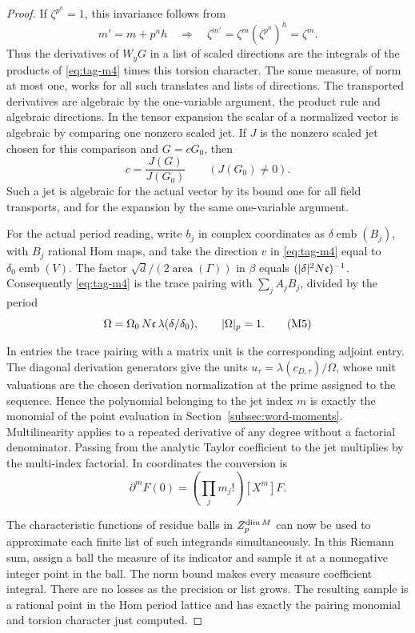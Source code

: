 \begin{proof}
If \(\zeta^{p^n}=1\), this invariance follows from
\[
  m'=m+p^n h\quad\Longrightarrow\quad\zeta^{m'}=\zeta^m(\zeta^{p^n})^h=\zeta^m .
\]
Thus the derivatives of \(W_yG\) in a list of scaled
directions are the integrals of the products of
\eqref{eq:tag-m4} times this torsion character. The same measure,
of norm at most one, works for all such translates
and lists of directions. The transported derivatives
are algebraic by the one-variable argument, the
product rule and algebraic directions. In the tensor
expansion the scalar of a normalized vector is
algebraic by comparing one nonzero scaled jet.
If \(J\) is the nonzero scaled jet chosen for this comparison and \(G=cG_0\), then
\[
  c=\frac{J(G)}{J(G_0)}\qquad(J(G_0)\ne0).
\]
Such a jet is algebraic for the actual vector by
its bound one for all field transports, and for the
expansion by the same one-variable argument.
\label{cor:word-measure-6}

For the actual period reading, write \(b_j\) in complex
coordinates as \(\delta\operatorname{emb}(B_j)\), with
\(B_j\) rational Hom maps, and take the direction \(v\)
in \eqref{eq:tag-m4} equal to \(\delta_0\operatorname{emb}(V)\).
The factor \(\sqrt d/(2\operatorname{area}(\Gamma))\)
in \(\beta\) equals \((\lvert\delta\rvert^2 N\mathfrak c)^{-1}\).
Consequently \eqref{eq:tag-m4} is the trace pairing with
\(\sum_j A_j B_j\), divided by the period
\[
       \Omega=\Omega_0\, N\mathfrak c\,\lambda(\delta/\delta_0),
                      \qquad \lvert\Omega\rvert_p=1.
\tag{M5}\label{eq:tag-m5}
\]

In entries the trace pairing with a matrix unit is the
corresponding adjoint entry. The diagonal derivation
generators give the units
\(u_\tau=\lambda(c_{D,\tau})/\Omega\), whose unit
valuations are the chosen derivation normalization at the
prime assigned to the sequence. Hence the polynomial belonging to the jet
index \(m\) is exactly the monomial of the point
evaluation in Section~\ref{subsec:word-moments}.
Multilinearity applies to a repeated derivative of any
degree without a factorial denominator. Passing from the
analytic Taylor coefficient to the jet multiplies by the
multi-index factorial.
In coordinates the conversion is
\[
  \partial^m F(0)=\left(\prod_j m_j!\right)[X^m]F .
\]

The characteristic functions of residue balls
in \(Z_p^{\dim M}\) can now be used to approximate each
finite list of such integrands simultaneously. In this
Riemann sum, assign a ball the measure of its indicator
and sample it at a nonnegative integer point in the ball.
The norm bound makes every measure coefficient integral.
There are no losses as the precision or list grows.
The resulting sample is a rational point in the Hom
period lattice and has exactly the pairing monomial
and torsion character just computed.
\end{proof}

